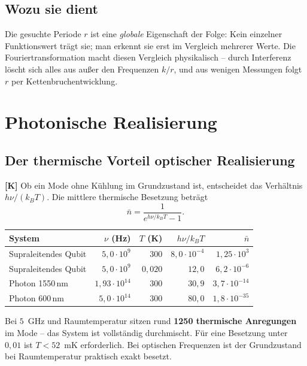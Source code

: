 \subsection{Wozu sie dient}

Die gesuchte Periode $r$ ist eine \emph{globale} Eigenschaft der Folge:
Kein einzelner Funktionswert trägt sie; man erkennt sie erst im
Vergleich mehrerer Werte. Die Fouriertransformation macht diesen
Vergleich physikalisch -- durch Interferenz löscht sich alles aus
außer den Frequenzen $k/r$, und aus wenigen Messungen folgt $r$ per
Kettenbruchentwicklung.

\section{Photonische Realisierung}
\label{sec:photonik}

\subsection{Der thermische Vorteil optischer Realisierung}

\textbf{[K]} Ob ein Mode ohne Kühlung im Grundzustand ist, entscheidet das
Verhältnis $h\nu/(k_B T)$. Die mittlere thermische Besetzung beträgt
\begin{equation}
  \bar n = \frac{1}{e^{h\nu/k_B T} - 1}.
\end{equation}

\begin{center}
\begin{tabular}{lrrrr}
\toprule
System & $\nu$ (Hz) & $T$ (K) & $h\nu/k_BT$ & $\bar n$ \\
\midrule
Supraleitendes Qubit & $5{,}0\cdot10^{9}$ & $300$ & $8{,}0\cdot10^{-4}$
  & $1{,}25\cdot10^{3}$ \\
Supraleitendes Qubit & $5{,}0\cdot10^{9}$ & $0{,}020$ & $12{,}0$
  & $6{,}2\cdot10^{-6}$ \\
Photon 1550\,nm & $1{,}93\cdot10^{14}$ & $300$ & $30{,}9$
  & $3{,}7\cdot10^{-14}$ \\
Photon 600\,nm & $5{,}0\cdot10^{14}$ & $300$ & $80{,}0$
  & $1{,}8\cdot10^{-35}$ \\
\bottomrule
\end{tabular}
\end{center}

Bei $5$~GHz und Raumtemperatur sitzen rund \textbf{1250 thermische
Anregungen} im Mode -- das System ist vollständig durchmischt. Für eine
Besetzung unter $0{,}01$ ist $T < 52$~mK erforderlich. Bei optischen
Frequenzen ist der Grundzustand bei Raumtemperatur praktisch exakt
besetzt.

